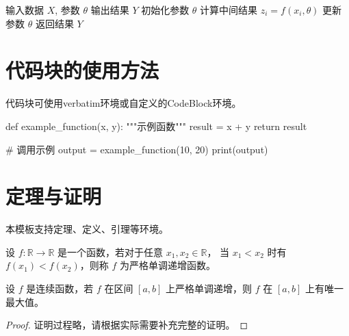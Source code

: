 \begin{algorithm}[htbp]
    \caption{示例算法}
    \label{alg:example}
    \begin{algorithmic}[1]
        \Require 输入数据 $X$, 参数 $\theta$
        \Ensure 输出结果 $Y$
        \State 初始化参数 $\theta$
            \State 计算中间结果 $z_i = f(x_i, \theta)$
                \State 更新参数 $\theta$
            \EndIf
        \EndFor
        \State 返回结果 $Y$
    \end{algorithmic}
\end{algorithm}

\section{代码块的使用方法}
代码块可使用verbatim环境或自定义的CodeBlock环境。

\begin{CodeBlock}
def example_function(x, y):
    """示例函数"""
    result = x + y
    return result

# 调用示例
output = example_function(10, 20)
print(output)
\end{CodeBlock}

\section{定理与证明}
本模板支持定理、定义、引理等环境。

\begin{defn}[示例定义]
设 $f: \mathbb{R} \to \mathbb{R}$ 是一个函数，若对于任意 $x_1, x_2 \in \mathbb{R}$，
当 $x_1 < x_2$ 时有 $f(x_1) < f(x_2)$，则称 $f$ 为严格单调递增函数。
\end{defn}

\begin{thm}[示例定理]
设 $f$ 是连续函数，若 $f$ 在区间 $[a, b]$ 上严格单调递增，则 $f$ 在 $[a, b]$ 上有唯一最大值。
\end{thm}

\begin{proof}
证明过程略，请根据实际需要补充完整的证明。
\end{proof}